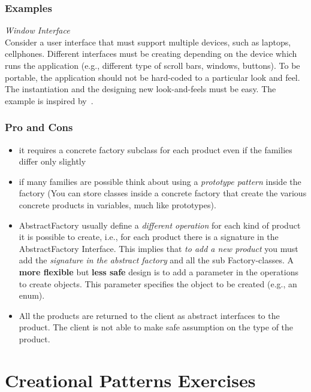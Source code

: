 \documentclass{article}
\begin{document}
\subsubsection{Examples}
\emph{Window Interface}\\
Consider a user interface that must support multiple devices, such as laptops, cellphones. Different interfaces must be creating depending on the device which runs the application (e.g., different type of scroll bars, windows, buttons). To be portable, the application should not be hard-coded to a particular look and feel. The instantiation and the designing new look-and-feels must be easy. The example is inspired by~\cite{gamma1994design}.



\subsubsection{Pro and Cons}
\begin{itemize}
\item it requires a concrete factory subclass for each product even if the families differ only slightly
\item if many families are possible think about using a \emph{prototype pattern} inside the factory (You can store classes inside a concrete factory that create the various concrete products in variables, much like prototypes).
\item AbstractFactory usually define a \emph{different operation} for each kind of product it is possible to create, i.e., for each product there is a signature in the AbstractFactory Interface. This implies that \emph{to add a new product} you must add the \emph{signature in the abstract factory} and all the sub Factory-classes. A \textbf{more flexible} but \textbf{less safe} design is to add a parameter in the operations to create objects. This parameter specifies the object to be created (e.g., an enum).
\item All the products are returned to the client as abstract interfaces to the product. The client is not able to make safe assumption on the type of the product.
\end{itemize}








\section{Creational Patterns Exercises}
\end{document}
